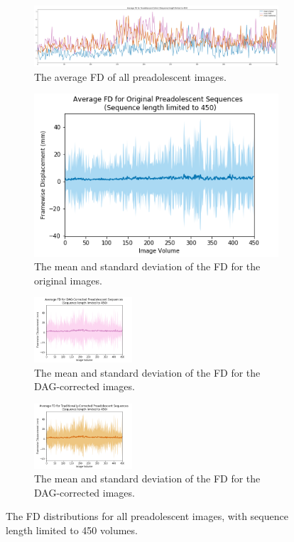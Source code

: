 \begin{figure}[t]
	\centering
	\begin{subfigure}{0.8\textwidth}
		\centering
		\includegraphics[width=1.0\textwidth]{6/figures/pread_fd_all_450_avg.png}
		\caption{The average FD of all preadolescent images.}
	\end{subfigure}

	\begin{subfigure}{0.9\textwidth}
		\centering
		\includegraphics[width=.4\textwidth]{6/figures/pread-bold-fd-450.png}
		\caption{The mean and standard deviation of the FD for the original images.}
	\end{subfigure}
	
	\begin{subfigure}{0.9\textwidth}
		\centering
		\includegraphics[width=0.4\textwidth]{6/figures/pread-dag-fd-450.png}
		\caption{The mean and standard deviation of the FD for the DAG-corrected images.}
	\end{subfigure}
	
	\begin{subfigure}{0.9\textwidth}
		\centering
		\includegraphics[width=0.4\textwidth]{6/figures/pread-trad-fd-450.png}
		\caption{The mean and standard deviation of the FD for the DAG-corrected images.}
	\end{subfigure}
\caption{The FD distributions for all preadolescent images, with sequence length limited to 450 volumes.}
\label{fig:pread-fd-450}
\end{figure}

